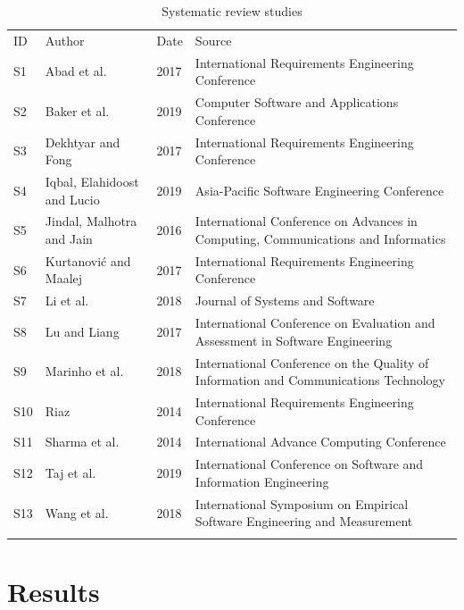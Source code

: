 \documentclass[conference]{IEEEtran}
\begin{document}
\begin{table}[!htbp]
\caption{Systematic review studies}
\label{tab:studies}       %
\begin{tabular}{p{0.1cm}p{2cm}p{0.4cm}p{4.4cm}}
\hline\noalign{\smallskip}
ID & Author & Date & Source \\
\noalign{\smallskip}\hline\noalign{\smallskip}
S1 & Abad et al. \cite{8049172} & 2017 & International Requirements Engineering Conference \\
S2 & Baker et al. \cite{8754214} & 2019 & Computer Software and Applications Conference \\
S3 & Dekhtyar and Fong \cite{8049170} & 2017 & International Requirements Engineering Conference \\
S4 & Iqbal, Elahidoost and Lucio \cite{8719411} & 2019 & Asia-Pacific Software Engineering Conference \\
S5 & Jindal, Malhotra and Jain \cite{7732349} & 2016 & International Conference on Advances in Computing, Communications and Informatics \\
S6 & Kurtanović and Maalej \cite{8049171} & 2017 & International Requirements Engineering Conference \\
S7 & Li et al. \cite{LI2018108} & 2018 & Journal of Systems and Software \\
S8 & Lu and Liang \cite{Lu:2017:ACN:3084226.3084241} & 2017 & International Conference on Evaluation and Assessment in Software Engineering \\
S9 & Marinho et al. \cite{8590177} & 2018 & International Conference on the Quality of Information and Communications Technology \\
S10 & Riaz \cite{6912260} & 2014 & International Requirements Engineering Conference \\
S11 & Sharma et al. \cite{6779538} & 2014 & International Advance Computing Conference \\
S12 & Taj et al. \cite{Taj:2019:ADM:3328833.3328837} & 2019 & International Conference on Software and Information Engineering \\
S13 & Wang et al. \cite{Wang:2018:ACI:3239235.3267428} & 2018 & International Symposium on Empirical Software Engineering and Measurement \\
\noalign{\smallskip}\hline
\end{tabular}
\end{table}

\section{Results}
\label{results}
\end{document}
